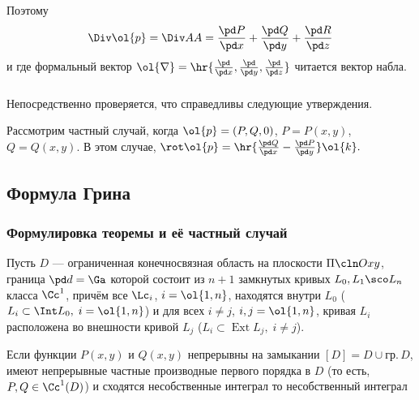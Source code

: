 \documentclass[a4paper]{article}
\DeclareMathOperator{\Ext}{Ext}
\begin{document}
Поэтому $$\Div\ol{p}=\Div AA=\frac{\pd P}{\pd x} + \frac{\pd Q}{\pd
y} + \frac{\pd R}{\pd z}$$ и  где формальный вектор $\ol{\nabla} =
\hr{\frac{\pd}{\pd x},\frac{\pd}{\pd y},\frac{\pd}{\pd z}}$ читается
 вектор набла.

\subsubsection{}

Непосредственно проверяется, что справедливы следующие утверждения.

\begin{theorem}
\end{theorem}

Рассмотрим частный случай, когда $\ol{p}=(P,Q,0)$, $P=P(x,y)$,
$Q=Q(x,y)$. В этом случае, $\rot\ol{p}=\hr{\frac{\pd Q}{\pd x} -
\frac{\pd P}{\pd y}}\ol{k}.$

\subsection{Формула Грина}
\subsubsection{Формулировка теоремы и её частный случай}

Пусть $D$ --- ограниченная конечносвязная область на плоскости
$\Pi\cln Oxy$, граница $\pd d=\Ga$ которой состоит из $n+1$
замкнутых кривых $L_0,L_1\sco L_n$ класса $\Cc^1$, причём все
$\Lc_i$, $i=\ol{1,n}$, находятся внутри $L_0$ ($L_i\subset\Int L_0,
\;i=\ol{1,n}$) и для всех $i\ne j$, $i,j=\ol{1,n}$, кривая $L_i$
расположена во внешности кривой $L_j$ ($L_i\subset\Ext L_j,\; i\ne
j$).


\begin{theorem}
Если функции $P(x,y)$ и $Q(x,y)$ непрерывны на замыкании $[D]=D\cup
гр.\,D$, имеют непрерывные частные производные первого порядка в $D$
(то есть, $P,Q\in\Cc^1(D)$) и сходятся несобственные интеграл
 то несобственный интеграл 
\end{theorem}
\end{document}
